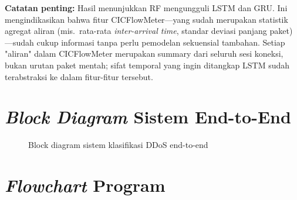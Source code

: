 \documentclass[11pt,a4paper,oneside]{report}
\begin{document}
\textbf{Catatan penting:} Hasil menunjukkan RF mengungguli LSTM dan GRU. Ini mengindikasikan bahwa fitur CICFlowMeter---yang sudah merupakan statistik agregat aliran (mis.\ rata-rata \textit{inter-arrival time}, standar deviasi panjang paket)---sudah cukup informasi tanpa perlu pemodelan sekuensial tambahan. Setiap "aliran" dalam CICFlowMeter merupakan summary dari seluruh sesi koneksi, bukan urutan paket mentah; sifat temporal yang ingin ditangkap LSTM sudah terabstraksi ke dalam fitur-fitur tersebut.

\section{\textit{Block Diagram} Sistem End-to-End}

\begin{figure}[h!]
\centering
{}
\caption{Block diagram sistem klasifikasi DDoS end-to-end}
\label{fig:block-diagram}
\end{figure}

\section{\textit{Flowchart} Program}
\end{document}

